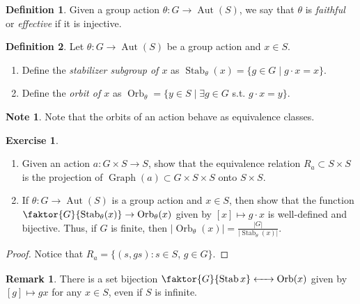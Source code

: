 \documentclass[10pt,letterpaper,cm]{nupset}
\theoremstyle{definition}
\newtheorem*{definition}{Definition}
\newtheorem{note}{Note}
\newtheorem{remark}{Remark}
\newtheorem{exercise}{Exercise}
\newcommand{\1}{\mathbf{1}}
\newcommand{\0}{\vec 0}
\DeclareMathOperator{\graph}{Graph}
\DeclareMathOperator{\aut}{Aut}
\DeclareMathOperator{\stab}{Stab}
\DeclareMathOperator{\orb}{Orb}
\begin{document}
\begin{definition}
Given a group action $\theta: G \to \aut(S)$, we say that $\theta$ is \textit{faithful} or \textit{effective} if it is injective. 
\end{definition}

\begin{definition} Let $\theta: G \to \aut(S)$ be a group action and $x\in S$.
\begin{enumerate}
\item Define the \textit{stabilizer subgroup of $x$} as $\stab_{\theta}(x)  = \{g \in G \mid g \cdot x = x\}$. 
\item Define the \textit{orbit of $x$} as $\orb_{\theta} = \{y \in S \mid \exists g \in G$ s.t. $g \cdot x = y\}$.
\end{enumerate}
\end{definition}

\begin{note}
Note that the orbits of an action behave as equivalence classes. 
\end{note}

\begin{exercise} $ $
\begin{enumerate}
\item Given an action $a: G \times S \to S$, show that the equivalence relation $R_a \subset S \times S$ is the projection of $\graph(a) \subset G\times S \times S$ onto $S \times S$.
\item If $\theta : G \to \aut(S)$ is a group action and $x\in S$, then show that the function $\faktor{G}{\stab_{\theta}(x)} \to \orb_{\theta}(x)$ given by $[x] \mapsto g \cdot x$ is well-defined and bijective. Thus, if $G$ is finite, then $\lvert{\orb_{\theta}(x)}\rvert = \frac{ |G|}{\lvert{\stab_{\theta}(x)}\rvert}$.
\end{enumerate}
\end{exercise}

\begin{proof}
Notice that $R_a = \{(s, gs): s \in S$, $g\in G\}$.
\end{proof}

\begin{remark}{There is a set bijection $\faktor{G}{\stab{x}}  \xleftrightarrow{\phantom{med}} \orb(x)$ given by $[g] \mapsto gx$ for any $x \in S$, even if $S$ is infinite.} 
\end{remark}
\end{document}
